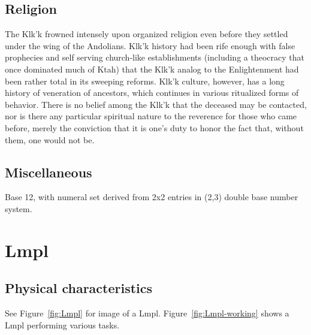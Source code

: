 \subsection{Religion}
The Klk'k frowned intensely upon organized religion even before they
settled under the wing of the Andolians. Klk'k history had been rife
enough with false prophecies and self serving church-like
establishments (including a theocracy that once dominated much of
Ktah) that the Klk'k analog to the Enlightenment had been rather total
in its sweeping reforms. Klk'k culture, however, has a long history of
veneration of ancestors, which continues in various ritualized forms
of behavior. There is no belief among the Klk'k that the deceased may
be contacted, nor is there any particular spiritual nature to the
reverence for those who came before, merely the conviction that it is
one's duty to honor the fact that, without them, one would not be.

\subsection{Miscellaneous}
Base 12, with numeral set derived from 2x2 entries in (2,3) double
base number system.

\section{Lmpl}

\subsection{Physical characteristics}
See Figure~\ref{fig:Lmpl} for image of a
Lmpl. Figure~\ref{fig:Lmpl-working} shows a Lmpl performing various
tasks.

